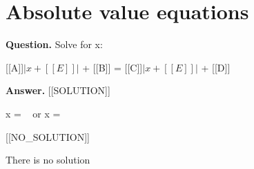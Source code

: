 \documentclass{article}
\begin{document}
\section*{Absolute value equations}
\textbf{Question.} Solve for x:
                    
                    
                        [[A]]$| x + [[E]] |$ + [[B]] =
                        [[C]]$| x + [[E]] |$ + [[D]]

\textbf{Answer.} [[SOLUTION]]
                        
                        
                            x =  
                              or
                            x =  
                        
                    
                    
                    
                        
                            
                                [[NO\_SOLUTION]]
                            
                            There is no solution
\end{document}

